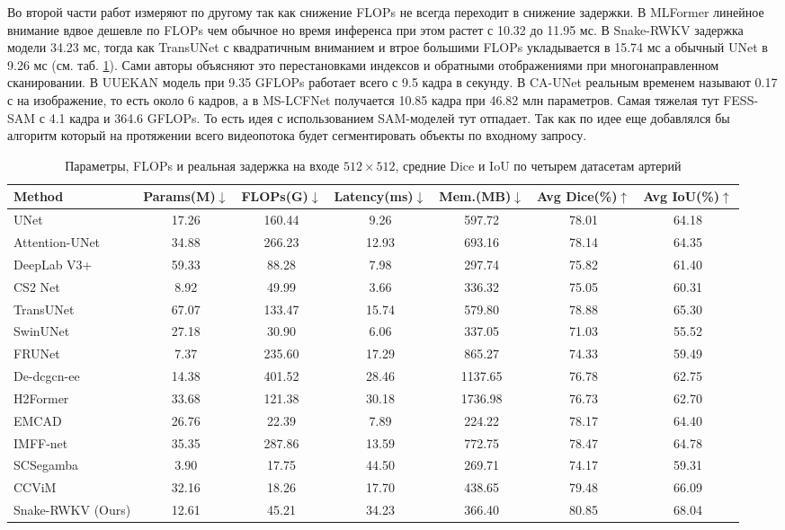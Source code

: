 \documentclass[areasetadvanced]{scrartcl}
\begin{document}
		Во второй части работ измеряют по другому так как снижение FLOPs не всегда переходит в снижение задержки. В MLFormer
		\cite{mlformer} линейное внимание вдвое дешевле по FLOPs чем обычное но время инференса при этом растет с 10.32 до 11.95 мс. В Snake-RWKV
		\cite{snakerwkv} задержка модели 34.23 мс, тогда как TransUNet с квадратичным вниманием и втрое большими FLOPs укладывается в 15.74 мс а обычный
		UNet в 9.26 мс (см. таб. \ref{tab:snake11}). Сами авторы объясняют это перестановками индексов и обратными отображениями при многонаправленном
		сканировании. В UUEKAN \cite{uuekan} модель при 9.35 GFLOPs работает всего с 9.5 кадра в секунду. В CA-UNet \cite{caunet} реальным временем
		называют 0.17 с на изображение, то есть около 6 кадров, а в MS-LCFNet \cite{mslcfnet} получается 10.85 кадра при 46.82 млн параметров.
		Самая тяжелая тут FESS-SAM \cite{fesssam} с 4.1 кадра и 364.6 GFLOPs. То есть идея с использованием SAM-моделей тут отпадает. Так как по идее 
		еще добавлялся бы алгоритм который на протяжении всего видеопотока будет сегментировать объекты по входному запросу.

		\begin{table}[H]
			\centering
			\footnotesize
			\caption{Параметры, FLOPs и реальная задержка на входе $512 \times 512$, средние Dice и IoU по четырем датасетам артерий \cite{snakerwkv}}
			\label{tab:snake11}
			\begin{tabular}{lcccccc}
				\toprule
				Method & Params(M)$\downarrow$ & FLOPs(G)$\downarrow$ & Latency(ms)$\downarrow$ & Mem.(MB)$\downarrow$ & Avg Dice(\%)$\uparrow$ & Avg IoU(\%)$\uparrow$ \\
				\midrule
				UNet & 17.26 & 160.44 & 9.26 & 597.72 & 78.01 & 64.18 \\
				Attention-UNet & 34.88 & 266.23 & 12.93 & 693.16 & 78.14 & 64.35 \\
				DeepLab V3+ & 59.33 & 88.28 & 7.98 & 297.74 & 75.82 & 61.40 \\
				CS2 Net & 8.92 & 49.99 & 3.66 & 336.32 & 75.05 & 60.31 \\
				TransUNet & 67.07 & 133.47 & 15.74 & 579.80 & 78.88 & 65.30 \\
				SwinUNet & 27.18 & 30.90 & 6.06 & 337.05 & 71.03 & 55.52 \\
				FRUNet & 7.37 & 235.60 & 17.29 & 865.27 & 74.33 & 59.49 \\
				De-dcgcn-ee & 14.38 & 401.52 & 28.46 & 1137.65 & 76.78 & 62.75 \\
				H2Former & 33.68 & 121.38 & 30.18 & 1736.98 & 76.73 & 62.70 \\
				EMCAD & 26.76 & 22.39 & 7.89 & 224.22 & 78.17 & 64.40 \\
				IMFF-net & 35.35 & 287.86 & 13.59 & 772.75 & 78.47 & 64.78 \\
				SCSegamba & 3.90 & 17.75 & 44.50 & 269.71 & 74.17 & 59.31 \\
				CCViM & 32.16 & 18.26 & 17.70 & 438.65 & 79.48 & 66.09 \\
				Snake-RWKV (Ours) & 12.61 & 45.21 & 34.23 & 366.40 & 80.85 & 68.04 \\
				\bottomrule
			\end{tabular}
		\end{table}
\end{document}
